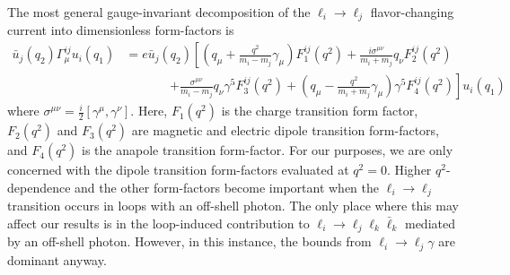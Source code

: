 The most general gauge-invariant decomposition of the $\ell_i\rightarrow\ell_j$ flavor-changing current into dimensionless form-factors is \cite{Nowakowski:2004cv}
\begin{align}
    \bar{u}_j(q_2)\Gamma^{ij}_\mu u_i(q_1) &= e\bar{u}_j(q_2)\left[\left(q_\mu+\frac{q^2}{m_i - m_j}\gamma_\mu\right) F_1^{ij}(q^2) + \frac{i\sigma^{\mu\nu}}{m_i + m_j}q_\nu F_2^{ij}(q^2)\right. \nonumber\\
    &\ \ \ \ \ \ \ \ \ \ \ \ \ \ \ \ \left. +\frac{\sigma^{\mu\nu}}{m_i - m_j}q_\nu \gamma^5 F_3^{ij}(q^2)+\left(q_\mu-\frac{q^2}{m_i + m_j}\gamma_\mu\right)\gamma^5 F_4^{ij}(q^2)\right]u_i(q_1)
\end{align}
where $\sigma^{\mu\nu} = \tfrac{i}{2}\left[\gamma^\mu,\gamma^\nu\right]$. Here, $F_1(q^2)$ is the charge transition form factor, $F_2(q^2)$ and $F_3(q^2)$ are magnetic and electric dipole transition form-factors, and $F_4(q^2)$ is the anapole transition form-factor. For our purposes, we are only concerned with the dipole transition form-factors evaluated at $q^2 = 0$. Higher $q^2$-dependence and the other form-factors become important when the $\ell_i\rightarrow \ell_j$ transition occurs in loops with an off-shell photon. The only place where this may affect our results is in the loop-induced contribution to $\ell_i \rightarrow \ell_j \ell_k\bar{\ell}_k$ mediated by an off-shell photon. However, in this instance, the bounds from $\ell_i\rightarrow \ell_j\gamma$ are dominant anyway.

